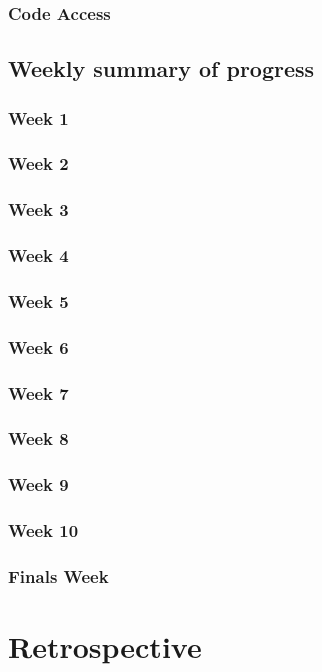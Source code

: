 \documentclass[onecolumn, draftclsnofoot,10pt, compsoc]{article}
\begin{document}
	    \subsubsection{Code Access}
	
	\subsection{Weekly summary of progress}
	
		\subsubsection{Week 1}
		
		\subsubsection{Week 2}
		
		\subsubsection{Week 3}
		
		\subsubsection{Week 4}
		
		\subsubsection{Week 5}
		
		\subsubsection{Week 6}
		
		\subsubsection{Week 7}
		
		\subsubsection{Week 8}
		
		\subsubsection{Week 9}
		
		\subsubsection{Week 10}
		
		\subsubsection{Finals Week}
		
\section{Retrospective}
\end{document}
